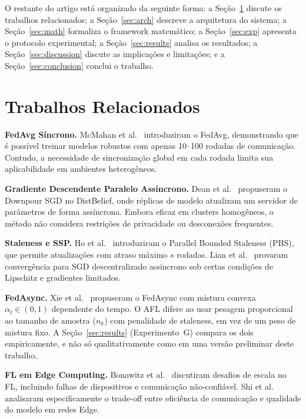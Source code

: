 \documentclass[conference,a4paper]{IEEEtran}
\begin{document}
O restante do artigo está organizado da seguinte forma: a
Seção~\ref{sec:related} discute os trabalhos relacionados; a
Seção~\ref{sec:arch} descreve a arquitetura do sistema; a
Seção~\ref{sec:math} formaliza o framework matemático; a
Seção~\ref{sec:exp} apresenta o protocolo experimental; a
Seção~\ref{sec:results} analisa os resultados; a
Seção~\ref{sec:discussion} discute as implicações e limitações; e a
Seção~\ref{sec:conclusion} conclui o trabalho.

\section{Trabalhos Relacionados}
\label{sec:related}

\textbf{FedAvg Síncrono.}
McMahan et al.~\cite{mcmahan2017} introduziram o FedAvg, demonstrando que
é possível treinar modelos robustos com apenas 10--100 rodadas de comunicação.
Contudo, a necessidade de sincronização global em cada rodada limita sua
aplicabilidade em ambientes heterogêneos.

\textbf{Gradiente Descendente Paralelo Assíncrono.}
Dean et al.~\cite{dean2012} propuseram o Downpour SGD no DistBelief, onde
réplicas de modelo atualizam um servidor de parâmetros de forma assíncrona.
Embora eficaz em clusters homogêneos, o método não considera restrições de
privacidade ou desconexões frequentes.

\textbf{Staleness e SSP.}
Ho et al.~\cite{ho2013} introduziram o Parallel Bounded Staleness (PBS),
que permite atualizações com atraso máximo $s$ rodadas. Lian et
al.~\cite{lian2017} provaram convergência para SGD descentralizado assíncrono
sob certas condições de Lipschitz e gradientes limitados.

\textbf{FedAsync.}
Xie et al.~\cite{xie2019} propuseram o FedAsync com mistura convexa
$\alpha_t \in (0,1)$ dependente do tempo. O AFL difere ao usar pesagem
proporcional ao tamanho de amostra ($n_k$) com penalidade de staleness, em
vez de um peso de mistura fixo. A Seção~\ref{sec:results} (Experimento~G)
compara os dois empiricamente, e não só qualitativamente como em uma
versão preliminar deste trabalho.

\textbf{FL em Edge Computing.}
Bonawitz et al.~\cite{bonawitz2019} discutiram desafios de escala no FL,
incluindo falhas de dispositivos e comunicação não-confiável.
Shi et al.~\cite{shi2020} analisaram especificamente o trade-off
entre eficiência de comunicação e qualidade do modelo em redes Edge.
\end{document}
